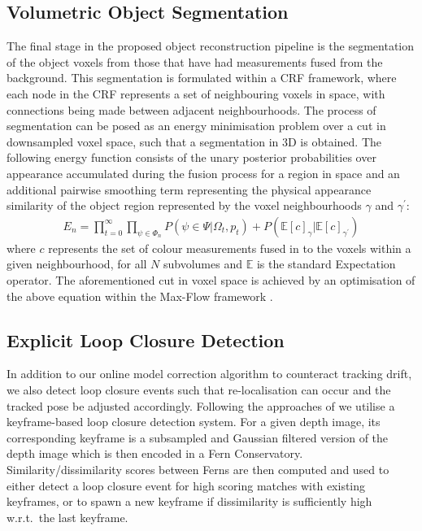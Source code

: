 \subsection{Volumetric Object Segmentation}
\label{subsec:shapeoptimisation}
The final stage in the proposed object reconstruction pipeline is the segmentation of the object voxels from those that have had measurements fused 
from the background. This segmentation is formulated within a CRF framework, where each node in the CRF represents a set of neighbouring voxels in space, 
with connections being made between adjacent neighbourhoods. The process of segmentation can be posed as an energy minimisation problem over a cut in downsampled voxel space, 
such that a segmentation in 3D is obtained. The following energy function consists of the unary posterior probabilities over appearance accumulated during the fusion 
process for a region in space and an additional pairwise smoothing term representing the physical appearance similarity of the object region represented by the voxel 
neighbourhoods $\gamma$ and $\gamma^{'}$:
\begin{equation}
\begin{split}
E_{n} = \prod_{t=0}^{\infty} \prod_{\psi \in \Phi_{n}} P(\psi \in \Psi | \Omega_{t}, p_{t}) + P(\mathbb{E}[c]_{\gamma} | \mathbb{E}[c]_{\gamma^{'}})
\end{split}
\end{equation}
where $c$ represents the set of colour measurements fused in to the voxels within a given neighbourhood, for all $N$ subvolumes and $\mathbb{E}$ is the standard Expectation operator.
The aforementioned cut in voxel space is achieved by an optimisation of the above equation within the Max-Flow framework \cite{BoykovKolmogorov}. 

\subsection{Explicit Loop Closure Detection}
In addition to our online model correction algorithm to counteract tracking drift, we also detect loop closure events such that re-localisation can occur and 
the tracked pose be adjusted accordingly. Following the approaches of \cite{Glocker15,Kahler2016} we utilise a keyframe-based loop closure detection system. For a 
given depth image, its corresponding keyframe is a subsampled and Gaussian filtered version of the depth image which is then encoded in a Fern Conservatory. 
Similarity/dissimilarity scores between Ferns are then computed and used to either detect a loop closure event for high scoring matches with existing keyframes, 
or to spawn a new keyframe if dissimilarity is sufficiently high w.r.t.\ the last keyframe.

